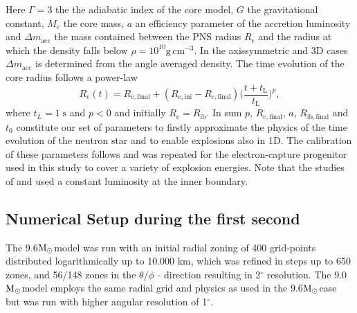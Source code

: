 \documentclass[fleqn,usenatbib]{mnras}
\newcommand{\solm}{\xspace\ensuremath{\rm{M_{\odot}}}}
\newcommand{\gcc}{\text{g}\, \text{cm}^{-3}}
\begin{document}
Here $\Gamma = 3$ the the adiabatic index of the core model, $G$ the gravitational constant, $M_{\mathrm{c}}$ the core mass, $a$ an efficiency parameter of the accretion luminosity and $\Delta m_{\mathrm{acc}}$ the mass contained between the PNS radius $R_\mathrm{c}$ and the radius at which the density falls below $\rho=10^{10}\gcc$. 
In the axissymmetric and 3D cases $\Delta m_{\mathrm{acc}}$ is determined from the angle averaged density.
The time evolution of the core radius follows a power-law 
\begin{equation}
    R_{\mathrm{c}}(t) =R_{\mathrm{c,final}} + (R_{\mathrm{c,ini}} - R_{\mathrm{c,final}}) \Big( \frac{t+t_{\mathrm{L}}} {t_{\mathrm{L}}}  \Big)^p,
\end{equation}
where $t_L = 1 \; \mathrm{s}$ and $p < 0$ and  initially $R_{\mathrm{c}} = R_{\mathrm{ib}}$.
In sum $p$, $R_{\mathrm{c,final}}$, $a$, $R_{\mathrm{ib,final}}$ and $t_0$ constitute our set of parameters to firstly approximate the physics of the time evolution of the neutron star and to enable explosions also in 1D.
The calibration of these parameters follows \cite{Ertl2016} and was repeated for the electron-capture progenitor used in this study to cover a variety of explosion energies.
Note that the studies of \cite{Wongwathanarat2015} and \cite{Gessner2018} used a constant luminosity at the inner boundary. 

\subsection{Numerical Setup during the first second}

The 9.6\solm model was run with an initial radial zoning of 400 grid-points distributed logarithmically up to 10.000 km, which was refined in steps up to 650 zones, and 56/148 zones in the $\theta/\phi$ - direction resulting in 2$^\circ$ resolution.
The 9.0\solm model employs the same radial grid and physics as used in the 9.6\solm case but was run with higher angular resolution of 1$^\circ$.
\end{document}
